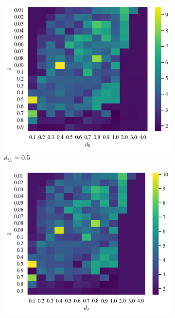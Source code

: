 \documentclass{article}
\begin{document}
\begin{figure}[H]
\begin{subfigure}[b]{0.49\textwidth}
	\end{subfigure}
	\begin{subfigure}[b]{0.49\textwidth}
		\includegraphics[width=\textwidth]{./figs/classVarDis0.5.png}
		\vspace{-1cm}
		\caption{$d_{th}=0.5$}
	\end{subfigure}
	\begin{subfigure}[b]{0.49\textwidth}
		\includegraphics[width=\textwidth]{./figs/classVarDis1.png}

\end{subfigure}
\end{figure}
\end{document}
